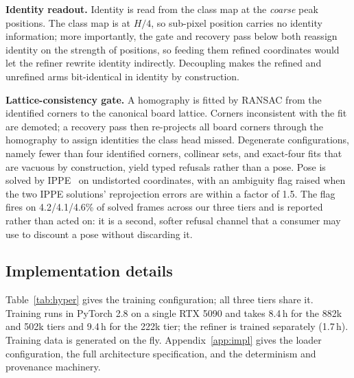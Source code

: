 \documentclass[10pt,twocolumn,letterpaper]{article}
\begin{document}
\textbf{Identity readout.} Identity is read from the class map at the \emph{coarse} peak positions.
The class map is at $H/4$, so sub-pixel position carries no identity information; more importantly,
the gate and recovery pass below both reassign identity on the strength of positions, so feeding
them refined coordinates would let the refiner rewrite identity indirectly. Decoupling makes the
refined and unrefined arms bit-identical in identity by construction.

\textbf{Lattice-consistency gate.} A homography is fitted by RANSAC from the identified corners to
the canonical board lattice. Corners inconsistent with the fit are demoted; a recovery pass then
re-projects all board corners through the homography to assign identities the class head missed.
Degenerate configurations, namely fewer than four identified corners, collinear sets, and
exact-four fits that are vacuous by construction, yield typed refusals rather than a pose. Pose is
solved by IPPE~\cite{ippe} on undistorted coordinates, with an ambiguity flag raised when the two
IPPE solutions' reprojection errors are within a factor of 1.5. The flag fires on 4.2/4.1/4.6\% of
solved frames across our three tiers and is reported rather than acted on: it is a second,
softer refusal channel that a consumer may use to discount a pose without discarding it.

\subsection{Implementation details}
\label{sec:impl}

Table~\ref{tab:hyper} gives the training configuration; all three tiers share it. Training runs in
PyTorch 2.8 on a single RTX 5090 and takes 8.4\,h for the 882k and 502k tiers and 9.4\,h for the
222k tier; the refiner is trained separately (1.7\,h). Training data is generated on the fly.
Appendix~\ref{app:impl} gives the loader configuration, the full architecture specification, and
the determinism and provenance machinery.
\end{document}

